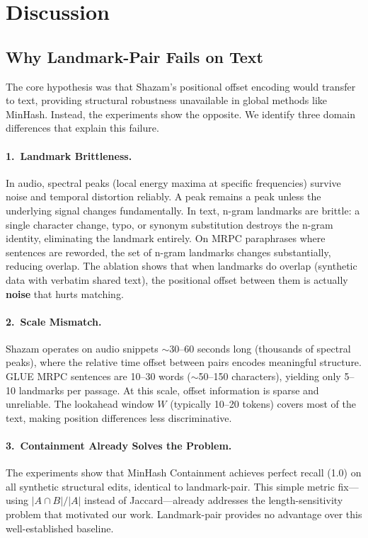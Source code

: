\documentclass[11pt,letterpaper]{article}
\begin{document}
\section{Discussion}

\subsection{Why Landmark-Pair Fails on Text}

The core hypothesis was that Shazam's positional offset encoding would transfer to text, providing structural robustness unavailable in global methods like MinHash. Instead, the experiments show the opposite. We identify three domain differences that explain this failure.

\paragraph{1.\ Landmark Brittleness.}
In audio, spectral peaks (local energy maxima at specific frequencies) survive noise and temporal distortion reliably. A peak remains a peak unless the underlying signal changes fundamentally. In text, n-gram landmarks are brittle: a single character change, typo, or synonym substitution destroys the n-gram identity, eliminating the landmark entirely. On MRPC paraphrases where sentences are reworded, the set of n-gram landmarks changes substantially, reducing overlap. The ablation shows that when landmarks do overlap (synthetic data with verbatim shared text), the positional offset between them is actually \textbf{noise} that hurts matching.

\paragraph{2.\ Scale Mismatch.}
Shazam operates on audio snippets $\sim$30--60 seconds long (thousands of spectral peaks), where the relative time offset between pairs encodes meaningful structure. GLUE MRPC sentences are 10--30 words ($\sim$50--150 characters), yielding only 5--10 landmarks per passage. At this scale, offset information is sparse and unreliable. The lookahead window $W$ (typically 10--20 tokens) covers most of the text, making position differences less discriminative.

\paragraph{3.\ Containment Already Solves the Problem.}
The experiments show that MinHash Containment achieves perfect recall (1.0) on all synthetic structural edits, identical to landmark-pair. This simple metric fix---using $|A \cap B|/|A|$ instead of Jaccard---already addresses the length-sensitivity problem that motivated our work. Landmark-pair provides no advantage over this well-established baseline.
\end{document}
